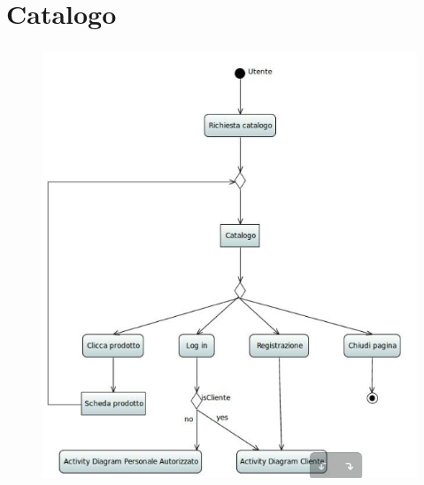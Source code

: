 \documentclass[a4paper,12pt]{report}
\begin{document}
	\section*{Catalogo}
	\begin{figure}[h]
		\centering
		\includegraphics[scale=0.6, height=13cm]{Activity_Catalogo}
	\end{figure}
	
	\newpage
\end{document}
